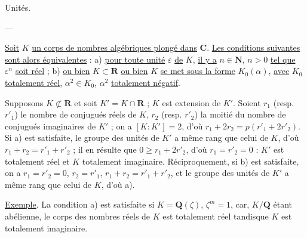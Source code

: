 
\begin{center}Unités.

---\end{center}

\uline{Soit} $K$ \uline{un corps de nombres algébriques plongé dans} $\mathbf C$. \uline{Les conditions suivantes sont alors équivalentes} : a) \uline{pour toute unité} $\varepsilon$ \uline{de} $K$, \uline{il y a} $n\in\mathbf N$, $n>0$ \uline{tel que} $\varepsilon^n$ \uline{soit réel} ; b)  \uline{ou bien} $K\subset\mathbf R$ \uline{ou bien} $K$ \uline{se met sous la forme} $K_0(\alpha)$, \uline{avec} $K_0$ \uline{totalement réel}, $\alpha^2\in K_0$, $\alpha^2$ \uline{totalement négatif}.

Supposons $K\not\subset\mathbf R$ et soit $K'=K\cap\mathbf R$ ; $K$ est extension   de $K'$. Soient $r_1$ (resp. $r'_1$) le nombre de conjugués réels de $K$, $r_2$ (resp. $r'_2$) la moitié du nombre de conjugués imaginaires de $K'$ ; on a $[K:K']=2$, d'où $r_1+2r_2=p(r'_1+2r'_2)$. Si a) est satisfaite, le groupe des unités de $K'$ a même rang que celui de $K$, d'où  $r_1+r_2=r'_1+r'_2$ ; il en résulte que $0\geq r_1+2r'_2$, d'où $r_1=r'_2=0$ : $K'$ est totalement réel et $K$ totalement imaginaire. Réciproquement, si b) est satisfaite, on a $r_1=r'_2=0$, $r_2=r'_1$, $r_1+r_2=r'_1+r'_2$, et le groupe des unités de $K'$ a même rang que celui de $K$, d'où a).

\uline{Exemple}. La condition a) est satisfaite si $K=\mathbf Q(\zeta)$, $\zeta^m=1$, car, $K/\mathbf Q$ étant abélienne, le corps des nombres réels de $K$ est totalement réel tandisque $K$ est totalement imaginaire.

